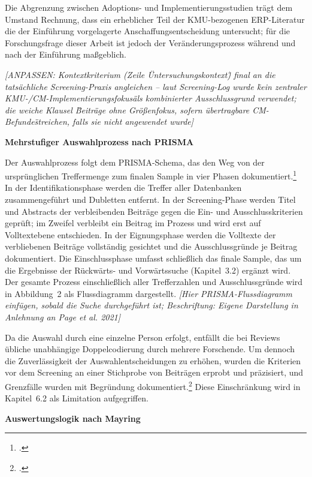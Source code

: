 Die Abgrenzung zwischen Adoptions- und Implementierungsstudien tr\"agt dem Umstand Rechnung, dass ein erheblicher Teil der KMU-bezogenen ERP-Literatur die der Einf\"uhrung vorgelagerte Anschaffungsentscheidung untersucht; f\"ur die Forschungsfrage dieser Arbeit ist jedoch der Ver\"anderungsprozess w\"ahrend und nach der Einf\"uhrung ma\ss{}geblich.

\textit{[ANPASSEN: Kontextkriterium (Zeile \"Untersuchungskontext\") final an die tats\"achliche Screening-Praxis angleichen -- laut Screening-Log wurde \"kein zentraler KMU-/CM-Implementierungsfokus\" als kombinierter Ausschlussgrund verwendet; die weiche Klausel \"Beitr\"age ohne Gr\"o\ss{}enfokus, sofern \"ubertragbare CM-Befunde\" streichen, falls sie nicht angewendet wurde]}

\textbf{Mehrstufiger Auswahlprozess nach PRISMA}

Der Auswahlprozess folgt dem PRISMA-Schema, das den Weg von der urspr\"unglichen Treffermenge zum finalen Sample in vier Phasen dokumentiert.\footcite[Vgl.][S.~1--3]{page2021} In der Identifikationsphase werden die Treffer aller Datenbanken zusammengef\"uhrt und Dubletten entfernt. In der Screening-Phase werden Titel und Abstracts der verbleibenden Beitr\"age gegen die Ein- und Ausschlusskriterien gepr\"uft; im Zweifel verbleibt ein Beitrag im Prozess und wird erst auf Volltextebene entschieden. In der Eignungsphase werden die Volltexte der verbliebenen Beitr\"age vollst\"andig gesichtet und die Ausschlussgr\"unde je Beitrag dokumentiert. Die Einschlussphase umfasst schlie\ss{}lich das finale Sample, das um die Ergebnisse der R\"uckw\"arts- und Vorw\"artssuche (Kapitel~3.2) erg\"anzt wird. Der gesamte Prozess einschlie\ss{}lich aller Trefferzahlen und Ausschlussgr\"unde wird in Abbildung~2 als Flussdiagramm dargestellt. \textit{[Hier PRISMA-Flussdiagramm einf\"ugen, sobald die Suche durchgef\"uhrt ist; Beschriftung: Eigene Darstellung in Anlehnung an Page et al. 2021]}

Da die Auswahl durch eine einzelne Person erfolgt, entf\"allt die bei Reviews \"ubliche unabh\"angige Doppelcodierung durch mehrere Forschende. Um dennoch die Zuverl\"assigkeit der Auswahlentscheidungen zu erh\"ohen, wurden die Kriterien vor dem Screening an einer Stichprobe von Beitr\"agen erprobt und pr\"azisiert, und Grenzf\"alle wurden mit Begr\"undung dokumentiert.\footcites[Vgl.][S.~124~ff.]{mayring2015}[][S.~9--10]{vombrocke2009} Diese Einschr\"ankung wird in Kapitel~6.2 als Limitation aufgegriffen.

\textbf{Auswertungslogik nach Mayring}

